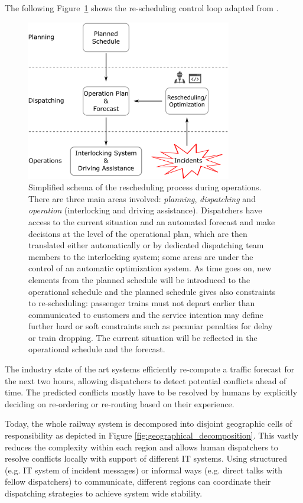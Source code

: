 \documentclass{article}
\begin{document}
The following Figure~\ref{fig:introduction_operations} shows the re-scheduling control loop adapted from \cite{rcsbrochure,rcswhitepaper}.
%
\begin{figure}[hbtp]
	\centering
  \includegraphics[width=0.8\textwidth]{Figures/rescheduling_schema_heute.pdf}
	\caption{Simplified schema of the rescheduling process during operations. There are three main areas involved: \emph{planning}, \emph{dispatching} and \emph{operation} (interlocking and driving assistance). Dispatchers have access to the current situation and an automated forecast and make decisions at the level of the operational plan, which are then translated either automatically or by dedicated dispatching team members to the interlocking system; some areas are under the control of an automatic optimization system. As time goes on, new elements from the planned schedule will be introduced to the operational schedule and the planned schedule gives also constraints to re-scheduling: passenger trains must not depart earlier than communicated to customers and the service intention may define further hard or soft constraints such as pecuniar penalties for delay or train dropping. The current situation will be reflected in the operational schedule and the forecast.}
	\label{fig:introduction_operations}
\end{figure}
%


The industry state of the art systems efficiently re-compute a traffic forecast for the next two hours, allowing dispatchers to detect potential conflicts ahead of time. The predicted conflicts mostly have to be resolved by humans by explicitly deciding on re-ordering or re-routing based on their experience.

Today, the whole railway system is decomposed into disjoint geographic cells of responsibility as depicted in Figure \ref{fig:geographical_decomposition}. This vastly reduces the complexity within each region and allows human dispatchers to resolve conflicts locally with support of different IT systems. Using structured (e.g. IT system of incident messages) or informal ways (e.g. direct talks with fellow dispatchers) to communicate, different regions can coordinate their dispatching strategies to achieve system wide stability.
\end{document}

